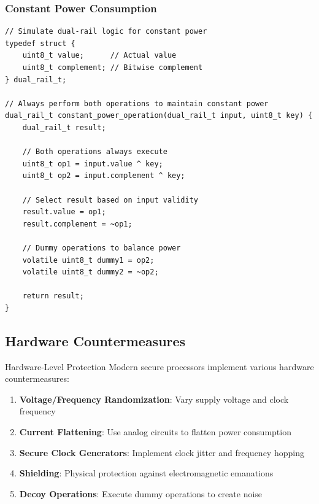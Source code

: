\documentclass[11pt,a4paper]{article}
\theoremstyle{definition}
\begin{document}
\subsubsection{Constant Power Consumption}

\begin{lstlisting}[caption={Dual-Rail Logic Simulation}]
// Simulate dual-rail logic for constant power
typedef struct {
    uint8_t value;      // Actual value
    uint8_t complement; // Bitwise complement
} dual_rail_t;

// Always perform both operations to maintain constant power
dual_rail_t constant_power_operation(dual_rail_t input, uint8_t key) {
    dual_rail_t result;
    
    // Both operations always execute
    uint8_t op1 = input.value ^ key;
    uint8_t op2 = input.complement ^ key;
    
    // Select result based on input validity
    result.value = op1;
    result.complement = ~op1;
    
    // Dummy operations to balance power
    volatile uint8_t dummy1 = op2;
    volatile uint8_t dummy2 = ~op2;
    
    return result;
}
\end{lstlisting}

\subsection{Hardware Countermeasures}

\begin{securitybox}{Hardware-Level Protection}
Modern secure processors implement various hardware countermeasures:

\begin{enumerate}
    \item \textbf{Voltage/Frequency Randomization}: Vary supply voltage and clock frequency
    \item \textbf{Current Flattening}: Use analog circuits to flatten power consumption
    \item \textbf{Secure Clock Generators}: Implement clock jitter and frequency hopping
    \item \textbf{Shielding}: Physical protection against electromagnetic emanations
    \item \textbf{Decoy Operations}: Execute dummy operations to create noise
\end{enumerate}
\end{securitybox}
\end{document}
